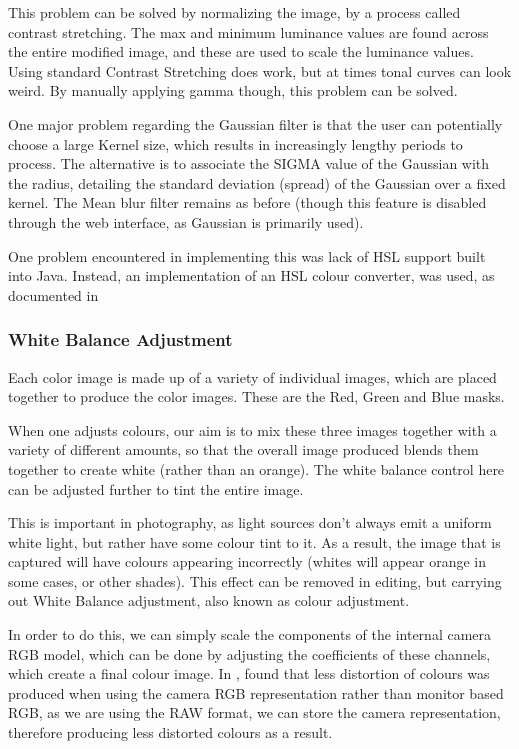 \documentclass[10pt,a4paper]{article}
\begin{document}
    This problem can be solved by normalizing the image, by a process called contrast stretching. The max and minimum luminance values are found across the
    entire modified image, and these are used to scale the luminance values. Using standard Contrast Stretching does work, but at times tonal curves can look weird. By manually applying gamma though, this problem can be
    solved.

    One major problem regarding the Gaussian filter is that the user can potentially choose a large Kernel size, which results in increasingly lengthy
    periods to process. The alternative is to associate the SIGMA value of the Gaussian with the radius, detailing the standard deviation (spread) of the
    Gaussian over a fixed kernel. The Mean blur filter remains as before (though this feature is disabled through the web interface, as Gaussian is
    primarily used).

    One problem encountered in implementing this was lack of HSL support built into Java. Instead, an implementation of an HSL colour converter, was used,
    as documented in \cite{HSLImplementation}
\subsubsection{White Balance Adjustment}
    Each color image is made up of a variety of individual images, which are placed together
    to produce the color images. These are the Red, Green and Blue masks.

    When one adjusts colours, our aim is to mix these three images together with a variety of different
    amounts, so that the overall image produced blends them together to create white (rather than an orange).
    The white balance control here can be adjusted further to tint the entire image.

    This is important in photography, as light sources don't always emit a uniform white light, but rather have some
    colour tint to it. As a result, the image that is captured will have colours appearing incorrectly (whites will appear 
    orange in some cases, or other shades). This effect can be removed in editing, but carrying out White Balance adjustment, also
    known as colour adjustment.

    In order to do this, we can simply scale the components of the internal camera RGB model, which can be done
    by adjusting the coefficients of these channels, which create a final colour image. In \cite{WhiteBalance}, \citeauthor{WhiteBalance}
    found that less distortion of colours was produced when using the camera RGB representation rather than monitor based
    RGB, as we are using the RAW format, we can store the camera representation, therefore producing less distorted colours
    as a result.
\end{document}
